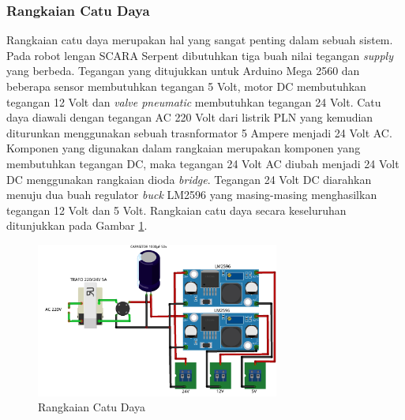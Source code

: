 \subsubsection{Rangkaian Catu Daya}
Rangkaian catu daya merupakan hal yang sangat penting dalam sebuah sistem. Pada robot lengan SCARA Serpent dibutuhkan tiga buah nilai tegangan \textit{supply} yang berbeda. Tegangan yang ditujukkan untuk Arduino Mega 2560 dan beberapa sensor membutuhkan tegangan 5 Volt, motor DC membutuhkan tegangan 12 Volt dan \textit{valve pneumatic} membutuhkan tegangan 24 Volt. Catu daya diawali dengan tegangan AC 220 Volt dari listrik PLN yang kemudian diturunkan menggunakan sebuah trasnformator 5 Ampere menjadi 24 Volt AC. Komponen yang digunakan dalam rangkaian merupakan komponen yang membutuhkan tegangan DC, maka tegangan 24 Volt AC diubah menjadi 24 Volt DC menggunakan rangkaian dioda \textit{bridge}. Tegangan 24 Volt DC diarahkan menuju dua buah regulator \textit{buck} LM2596 yang masing-masing menghasilkan tegangan 12 Volt dan 5 Volt. Rangkaian catu daya secara keseluruhan ditunjukkan pada Gambar \ref{pic.skematikcatu}.
\begin{figure}[H]
	\centering
	\includegraphics[width=8cm]{gambar/catudaya_bb.png}
	\caption{Rangkaian Catu Daya}
	\label{pic.skematikcatu}
\end{figure}
